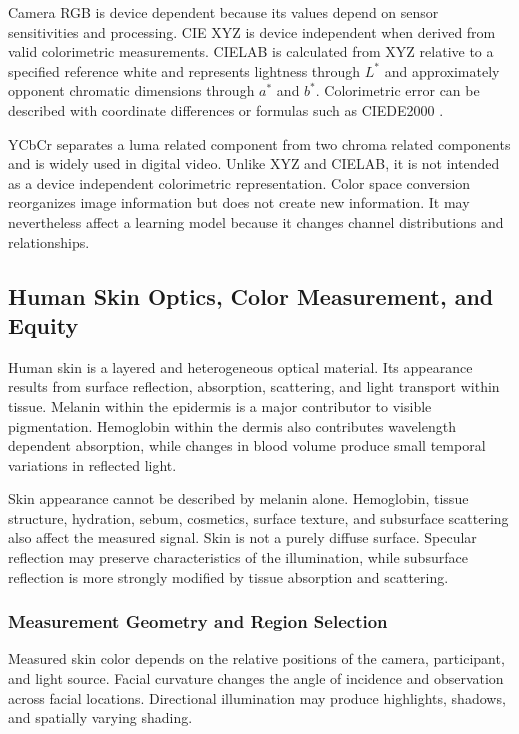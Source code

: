 \documentclass[12pt]{article}
\begin{document}
Camera RGB is device dependent because its values depend on sensor sensitivities and processing. CIE XYZ is device independent when derived from valid colorimetric measurements. CIELAB is calculated from XYZ relative to a specified reference white and represents lightness through \(L^*\) and approximately opponent chromatic dimensions through \(a^*\) and \(b^*\). Colorimetric error can be described with coordinate differences or formulas such as CIEDE2000 \cite{sharma2005}.

YCbCr separates a luma related component from two chroma related components and is widely used in digital video. Unlike XYZ and CIELAB, it is not intended as a device independent colorimetric representation. Color space conversion reorganizes image information but does not create new information. It may nevertheless affect a learning model because it changes channel distributions and relationships.

\subsection{Human Skin Optics, Color Measurement, and Equity}

Human skin is a layered and heterogeneous optical material. Its appearance results from surface reflection, absorption, scattering, and light transport within tissue. Melanin within the epidermis is a major contributor to visible pigmentation. Hemoglobin within the dermis also contributes wavelength dependent absorption, while changes in blood volume produce small temporal variations in reflected light.

Skin appearance cannot be described by melanin alone. Hemoglobin, tissue structure, hydration, sebum, cosmetics, surface texture, and subsurface scattering also affect the measured signal. Skin is not a purely diffuse surface. Specular reflection may preserve characteristics of the illumination, while subsurface reflection is more strongly modified by tissue absorption and scattering.

\subsubsection{Measurement Geometry and Region Selection}

Measured skin color depends on the relative positions of the camera, participant, and light source. Facial curvature changes the angle of incidence and observation across facial locations. Directional illumination may produce highlights, shadows, and spatially varying shading.
\end{document}
